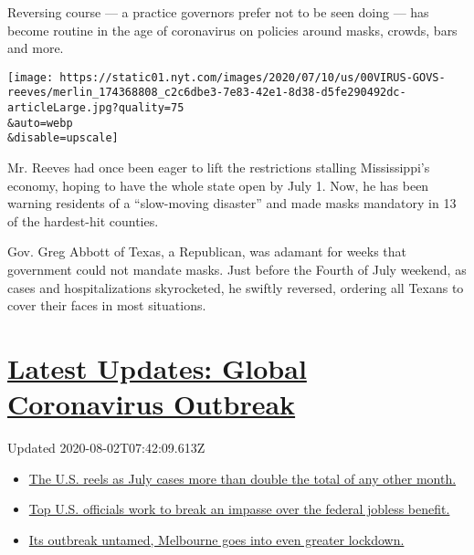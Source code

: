 Reversing course --- a practice governors prefer not to be seen doing
--- has become routine in the age of coronavirus on policies around
masks, crowds, bars and more.

\texttt{[image: https://static01.nyt.com/images/2020/07/10/us/00VIRUS-GOVS-reeves/merlin\_174368808\_c2c6dbe3-7e83-42e1-8d38-d5fe290492dc-articleLarge.jpg?quality=75\\\&auto=webp\\\&disable=upscale]}

Mr. Reeves had once been eager to lift the restrictions stalling
Mississippi's economy, hoping to have the whole state open by July 1.
Now, he has been warning residents of a ``slow-moving disaster'' and
made masks mandatory in 13 of the hardest-hit counties.

Gov. Greg Abbott of Texas, a Republican, was adamant for weeks that
government could not mandate masks. Just before the Fourth of July
weekend, as cases and hospitalizations skyrocketed, he swiftly reversed,
ordering all Texans to cover their faces in most situations.

\hypertarget{latest-updates-global-coronavirus-outbreak}{%
\section{\texorpdfstring{\href{https://www.nytimes.com/2020/08/01/world/coronavirus-covid-19.html?action=click\&pgtype=Article\&state=default\&region=MAIN_CONTENT_1\&context=storylines_live_updates}{Latest
Updates: Global Coronavirus
Outbreak}}{Latest Updates: Global Coronavirus Outbreak}}\label{latest-updates-global-coronavirus-outbreak}}

Updated 2020-08-02T07:42:09.613Z

\begin{itemize}
\tightlist
\item
  \href{https://www.nytimes.com/2020/08/01/world/coronavirus-covid-19.html?action=click\&pgtype=Article\&state=default\&region=MAIN_CONTENT_1\&context=storylines_live_updates\#link-34047410}{The
  U.S. reels as July cases more than double the total of any other
  month.}
\item
  \href{https://www.nytimes.com/2020/08/01/world/coronavirus-covid-19.html?action=click\&pgtype=Article\&state=default\&region=MAIN_CONTENT_1\&context=storylines_live_updates\#link-780ec966}{Top
  U.S. officials work to break an impasse over the federal jobless
  benefit.}
\item
  \href{https://www.nytimes.com/2020/08/01/world/coronavirus-covid-19.html?action=click\&pgtype=Article\&state=default\&region=MAIN_CONTENT_1\&context=storylines_live_updates\#link-2bc8948}{Its
  outbreak untamed, Melbourne goes into even greater lockdown.}
\end{itemize}


